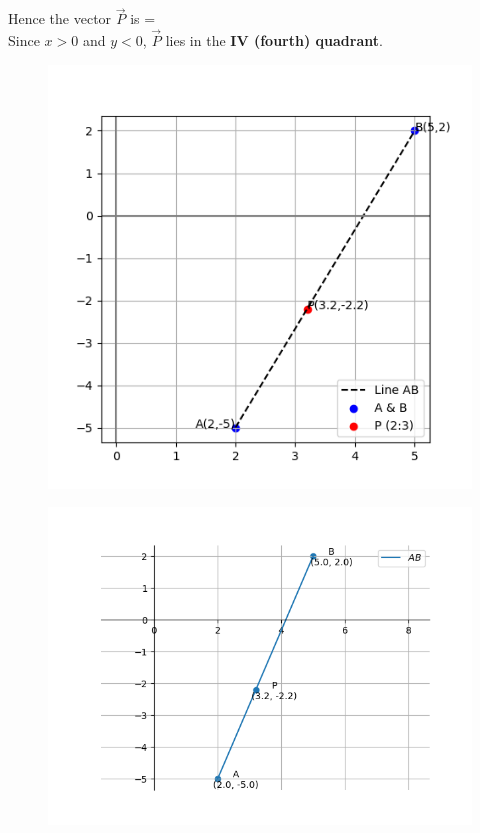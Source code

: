 \documentclass[journal]{article}
\begin{document}
Hence the vector $\vec{P}$ is   =  \\[4pt]
Since \(x>0\) and \(y<0\), $\vec{P}$ lies in the \textbf{IV (fourth) quadrant}.
\newpage
\begin{figure}
    \centering
    \includegraphics[width=0.9\linewidth]{figs/fig_1.png}
    \caption{}
    \label{fig:placeholder}
\end{figure}
\begin{figure}
    \centering
    \includegraphics[width=1.0\linewidth]{figs/fig_2.png}
    \caption{}
    \label{fig:placeholder}
\end{figure}
\end{document}
